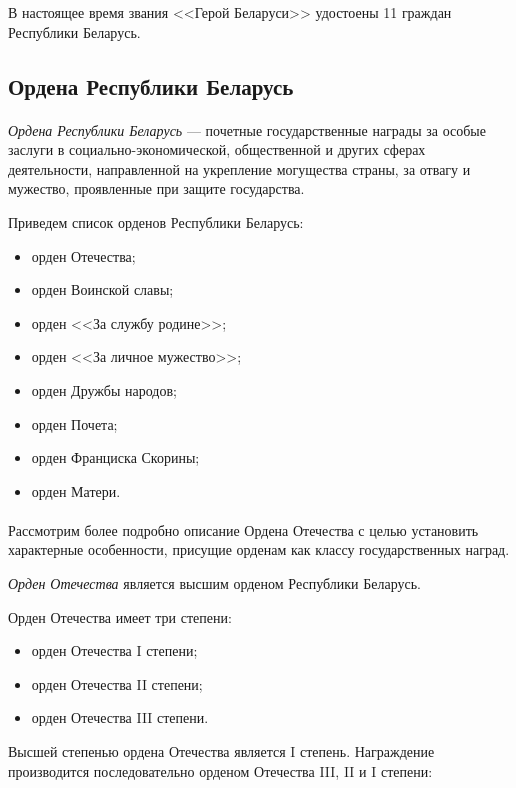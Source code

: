 В настоящее время звания <<Герой Беларуси>> удостоены 11 граждан
Республики Беларусь.

\subsection{Ордена Республики Беларусь}

\paragraph{}
\textit{Ордена Республики Беларусь} --- почетные государственные награды
за особые заслуги в социально-экономической,
общественной и других сферах деятельности,
направленной на укрепление могущества страны, за отвагу и мужество,
проявленные при защите государства.

Приведем список орденов Республики Беларусь:
\begin{itemize}
\item орден Отечества;
\item орден Воинской славы;
\item орден <<За службу родине>>;
\item орден <<За личное мужество>>;
\item орден Дружбы народов;
\item орден Почета;
\item орден Франциска Скорины;
\item орден Матери.
\end{itemize}

\paragraph{}
Рассмотрим более подробно описание Ордена Отечества с целью установить 
характерные особенности, присущие орденам как классу государственных наград.

\textit{Орден Отечества} является высшим орденом Республики Беларусь.

Орден Отечества имеет три степени:

\begin{itemize}
\item орден Отечества I степени;
\item орден Отечества II степени;
\item орден Отечества III степени.
\end{itemize}

Высшей степенью ордена Отечества является I степень.
Награждение производится последовательно орденом Отечества III, II и I степени:

